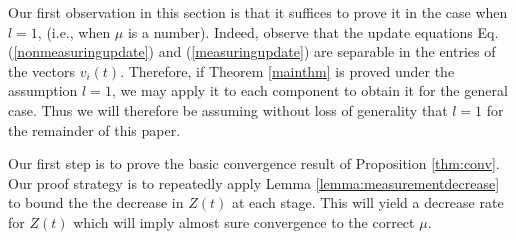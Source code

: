 \documentclass[final]{siamltex}
\begin{document}
Our first observation in this section is that it suffices to prove it in the case when $l=1$, (i.e., when $\mu$ is a number). Indeed, observe that the update 
equations Eq. (\ref{nonmeasuringupdate}) and (\ref{measuringupdate}) are separable in the entries of the vectors $v_i(t)$. Therefore, if Theorem \ref{mainthm} is proved under the assumption $l=1$, we may apply it to each component to obtain it for the general case. Thus we will therefore be assuming without loss of generality that $l=1$ for the remainder of this paper.

Our first step is to prove the basic convergence result of Proposition \ref{thm:conv}. Our proof strategy is to repeatedly apply Lemma \ref{lemma:measurementdecrease} to bound the the decrease in $Z(t)$ at each stage. This will yield a decrease rate for $Z(t)$ which will imply almost sure convergence to the correct $\mu$.

\bigskip
\end{document}

